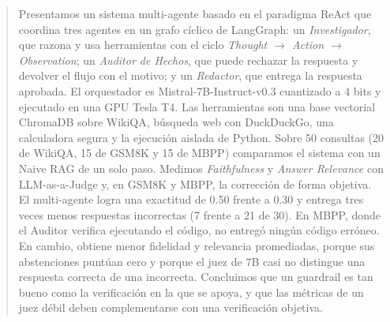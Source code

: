 \begin{abstract}
Presentamos un sistema multi-agente basado en el paradigma ReAct que coordina tres agentes en un grafo cíclico de LangGraph:
un \emph{Investigador}, que razona y usa herramientas con el ciclo \emph{Thought $\rightarrow$ Action $\rightarrow$ Observation};
un \emph{Auditor de Hechos}, que puede rechazar la respuesta y devolver el flujo con el motivo; y un \emph{Redactor}, que entrega la respuesta aprobada.
El orquestador es Mistral-7B-Instruct-v0.3 cuantizado a 4 bits y ejecutado en una GPU Tesla T4.
Las herramientas son una base vectorial ChromaDB sobre WikiQA, búsqueda web con DuckDuckGo, una calculadora segura y la ejecución aislada de Python.
Sobre 50 consultas (20 de WikiQA, 15 de GSM8K y 15 de MBPP) comparamos el sistema con un Naive RAG de un solo paso.
Medimos \emph{Faithfulness} y \emph{Answer Relevance} con LLM-as-a-Judge y, en GSM8K y MBPP, la corrección de forma objetiva.
El multi-agente logra una exactitud de 0.50 frente a 0.30 y entrega tres veces menos respuestas incorrectas (7 frente a 21 de 30).
En MBPP, donde el Auditor verifica ejecutando el código, no entregó ningún código erróneo.
En cambio, obtiene menor fidelidad y relevancia promediadas, porque sus abstenciones puntúan cero y porque el juez de 7B casi no distingue una respuesta correcta de una incorrecta.
Concluimos que un guardrail es tan bueno como la verificación en la que se apoya, y que las métricas de un juez débil deben complementarse con una verificación objetiva.
\end{abstract}
